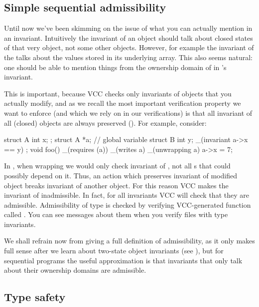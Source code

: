 \subsection{Simple sequential admissibility}
\label{sect:admissibility0}

Until now we've been skimming on the issue of what you can actually
mention in an invariant. 
Intuitively the invariant of an object should talk about closed states
of that very object, not some other objects.
However, for example the invariant of the  
talks about the values stored in its underlying array.
This also seems natural: one should be able to mention things
from the ownership domain of  in 's invariant.

This is important, because VCC checks only invariants of objects
that you actually modify, and as we recall the most important
verification property we want to enforce (and which we rely on in our
verifications) is that all invariant of all (closed) objects 
are always preserved ().
For example, consider:

\begin{VCC}
struct A { int x; };
struct A *a; // global variable
struct B {
  int y;
  _(invariant a->x == y)
};
void foo()
  _(requires \wrapped(a))
  _(writes a)
{
  _(unwrapping a) { a->x = 7; }
}
\end{VCC}

\noindent
In , when wrapping  we would only check invariant
of , not all s that could possibly depend on it.
Thus, an action which preserves invariant of modified object breaks invariant of another object.
For this reason VCC makes the invariant of  inadmissible.
In fact, for all invariants VCC will check that they are admissible.
Admissibility of type  is checked by verifying VCC-generated
function called .
You can see messages about them when you verify files with type
invariants.

We shall refrain now from giving a full definition of admissibility, as 
it only makes full sense after we learn about two-state object invariants
(see ), but for sequential programs the useful approximation
is that invariants that only talk about their ownership domains are admissible.


\subsection{Type safety}
\label{sect:type-safety}

